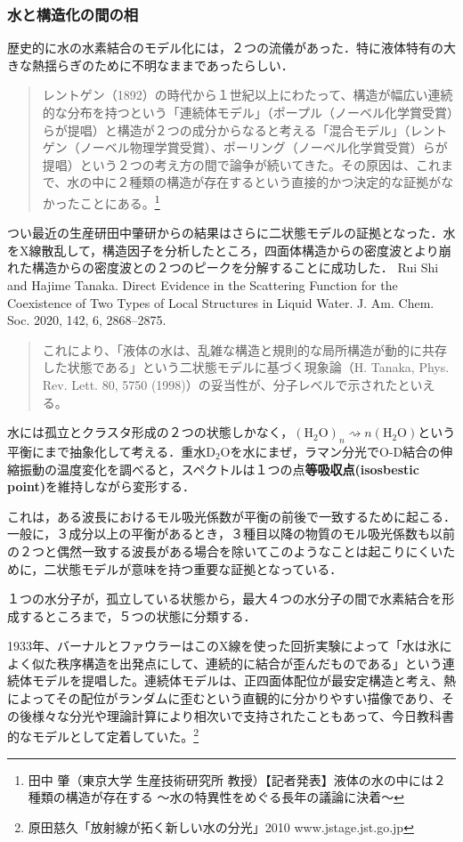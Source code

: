 \documentclass[uplatex, dvipdfmx]{jsreport}
\begin{document}
\subsubsection*{水と構造化の間の相}
歴史的に水の水素結合のモデル化には，２つの流儀があった．特に液体特有の大きな熱揺らぎのために不明なままであったらしい．
\begin{quote}
    レントゲン（1892）の時代から１世紀以上にわたって、構造が幅広い連続的な分布を持つという「連続体モデル」（ポープル（ノーベル化学賞受賞）らが提唱）と構造が２つの成分からなると考える「混合モデル」（レントゲン（ノーベル物理学賞受賞）、ポーリング（ノーベル化学賞受賞）らが提唱）という２つの考え方の間で論争が続いてきた。その原因は、これまで、水の中に２種類の構造が存在するという直接的かつ決定的な証拠がなかったことにある。\footnote{田中 肇（東京大学 生産技術研究所 教授）【記者発表】液体の水の中には２種類の構造が存在する ～水の特異性をめぐる長年の議論に決着～}
\end{quote}
つい最近の生産研田中肇研からの結果はさらに二状態モデルの証拠となった．水をX線散乱して，構造因子を分析したところ，四面体構造からの密度波とより崩れた構造からの密度波との２つのピークを分解することに成功した．
Rui Shi and Hajime Tanaka. Direct Evidence in the Scattering Function for the Coexistence of Two Types of Local Structures in Liquid Water. J. Am. Chem. Soc. 2020, 142, 6, 2868–2875.
\begin{quote}
    これにより、「液体の水は、乱雑な構造と規則的な局所構造が動的に共存した状態である」という二状態モデルに基づく現象論（H. Tanaka, Phys. Rev. Lett. 80, 5750 (1998)）の妥当性が、分子レベルで示されたといえる。
\end{quote}

\begin{model}
    水には孤立とクラスタ形成の２つの状態しかなく，$(\mathrm{H_2O})_n\rightsquigarrow n(\mathrm{H_2O})$という平衡にまで抽象化して考える．重水$\mathrm{D_2O}$を水にまぜ，ラマン分光でO-D結合の伸縮振動の温度変化を調べると，スペクトルは１つの点\textbf{等吸収点(isosbestic point)}を維持しながら変形する．

    これは，ある波長におけるモル吸光係数が平衡の前後で一致するために起こる．一般に，３成分以上の平衡があるとき，３種目以降の物質のモル吸光係数も以前の２つと偶然一致する波長がある場合を除いてこのようなことは起こりにくいために，二状態モデルが意味を持つ重要な証拠となっている．
\end{model}

\begin{model}
    １つの水分子が，孤立している状態から，最大４つの水分子の間で水素結合を形成するところまで，５つの状態に分類する．
\end{model}
\begin{remark}
    1933年、バーナルとファウラーはこのX線を使った回折実験によって「水は氷によく似た秩序構造を出発点にして、連続的に結合が歪んだものである」という連続体モデルを提唱した。連続体モデルは、正四面体配位が最安定構造と考え、熱によってその配位がランダムに歪むという直観的に分かりやすい描像であり、その後様々な分光や理論計算により相次いで支持されたこともあって、今日教科書的なモデルとして定着していた。\footnote{原田慈久「放射線が拓く新しい水の分光」2010 www.jstage.jst.go.jp}
\end{remark}
\end{document}
